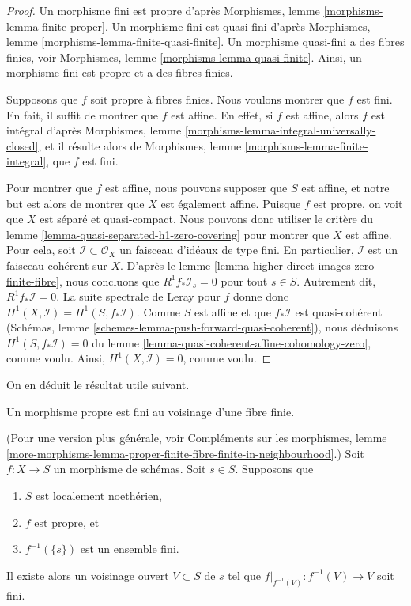 \begin{proof}
Un morphisme fini est propre d'après
Morphismes, lemme \ref{morphisms-lemma-finite-proper}.
Un morphisme fini est quasi-fini d'après
Morphismes, lemme \ref{morphisms-lemma-finite-quasi-finite}.
Un morphisme quasi-fini a des fibres finies, voir
Morphismes, lemme \ref{morphisms-lemma-quasi-finite}.
Ainsi, un morphisme fini est propre et a des fibres finies.

\medskip\noindent
Supposons que $f$ soit propre à fibres finies.
Nous voulons montrer que $f$ est fini.
En fait, il suffit de montrer que $f$ est affine.
En effet, si $f$ est affine, alors
$f$ est intégral d'après
Morphismes, lemme \ref{morphisms-lemma-integral-universally-closed},
et il résulte alors
de Morphismes, lemme \ref{morphisms-lemma-finite-integral},
que $f$ est fini.

\medskip\noindent
Pour montrer que $f$ est affine, nous pouvons supposer que $S$ est affine, et notre
but est alors de montrer que $X$ est également affine.
Puisque $f$ est propre, on voit que $X$ est séparé et quasi-compact.
Nous pouvons donc utiliser le critère du
lemme \ref{lemma-quasi-separated-h1-zero-covering} pour montrer que $X$
est affine. Pour cela, soit $\mathcal{I} \subset \mathcal{O}_X$
un faisceau d'idéaux de type fini. En particulier, $\mathcal{I}$ est
un faisceau cohérent sur $X$. D'après le
lemme \ref{lemma-higher-direct-images-zero-finite-fibre}, nous concluons que
$R^1f_*\mathcal{I}_s = 0$ pour tout $s \in S$.
Autrement dit, $R^1f_*\mathcal{I} = 0$. La suite spectrale
de Leray pour $f$ donne donc
$H^1(X , \mathcal{I}) = H^1(S, f_*\mathcal{I})$.
Comme $S$ est affine et que $f_*\mathcal{I}$ est quasi-cohérent
(Schémas, lemme \ref{schemes-lemma-push-forward-quasi-coherent}),
nous déduisons $H^1(S, f_*\mathcal{I}) = 0$
du lemme \ref{lemma-quasi-coherent-affine-cohomology-zero},
comme voulu. Ainsi, $H^1(X, \mathcal{I}) = 0$, comme voulu.
\end{proof}

\noindent
On en déduit le résultat utile suivant.

\begin{lemma}
\label{lemma-proper-finite-fibre-finite-in-neighbourhood}
\begin{slogan}
Un morphisme propre est fini au voisinage d'une fibre finie.
\end{slogan}
(Pour une version plus générale, voir Compléments
sur les morphismes,
lemme \ref{more-morphisms-lemma-proper-finite-fibre-finite-in-neighbourhood}.)
Soit $f : X \to S$ un morphisme de schémas.
Soit $s \in S$. Supposons
que
\begin{enumerate}
\item $S$ est localement noethérien,
\item $f$ est propre, et
\item $f^{-1}(\{s\})$ est un ensemble fini.
\end{enumerate}
Il existe alors un voisinage ouvert $V \subset S$ de $s$
tel que $f|_{f^{-1}(V)} : f^{-1}(V) \to V$ soit fini.
\end{lemma}

